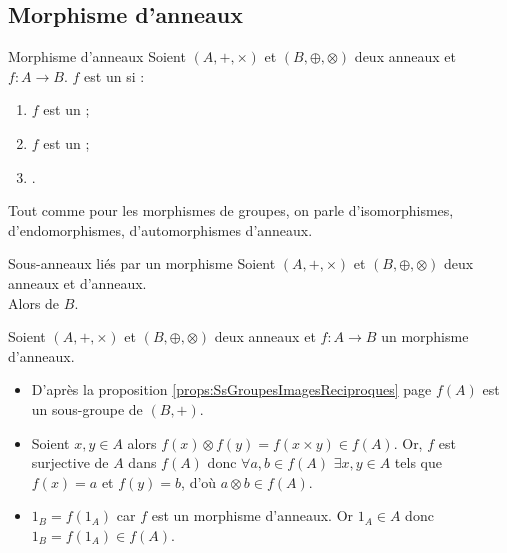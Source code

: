 \documentclass[12pt,a4paper]{report}
\begin{document}
    
    \subsection{Morphisme d'anneaux}
    
    \begin{definition}{Morphisme d'anneaux}{}
    Soient $(A, +, \times)$ et $(B, \oplus, \otimes)$ deux anneaux et $f : A \rightarrow B$. $f$ est un  si :
    \begin{enumerate}[label=\bfseries\arabic*)]
        \item $f$ est un  ;
        \item $f$ est un  ;
        \item {}.
    \end{enumerate}
    \end{definition}
    
    \begin{remarque}
    Tout comme pour les morphismes de groupes, on parle d'isomorphismes, d'endomorphismes, d'automorphismes d'anneaux.
    \end{remarque}
    
    \begin{proposition}{Sous-anneaux liés par un morphisme}{}
    Soient $(A, +, \times)$ et $(B, \oplus, \otimes)$ deux anneaux et  d'anneaux.\\
    Alors  de $B$.
    \end{proposition}
    
    \begin{demo}
    Soient $(A, +, \times)$ et $(B, \oplus, \otimes)$ deux anneaux et $f : A \rightarrow B$ un morphisme d'anneaux.
    \begin{itemize}[label=$\cdot$]
        \item D'après la proposition \ref{props:SsGroupesImagesReciproques} page \pageref{props:SsGroupesImagesReciproques} $f(A)$ est un sous-groupe de $(B, +)$.
        \item Soient $x, y \in A$ alors $f(x) \otimes f(y) = f(x \times y) \in f(A)$. Or, $f$ est surjective de $A$ dans $f(A)$ donc $\forall a, b \in f(A)$ $\exists x, y \in A$ tels que $f(x) = a$ et $f(y) = b$, d'où $a \otimes b \in f(A)$.
        \item $1_B = f(1_A)$ car $f$ est un morphisme d'anneaux. Or $1_A \in A$ donc $1_B = f(1_A) \in f(A)$.
    \end{itemize}
    \end{demo}
\end{document}
